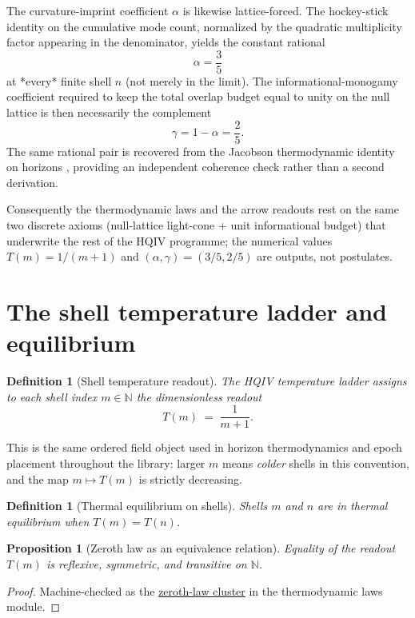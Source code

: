 \documentclass[11pt]{amsart}
\newtheorem{proposition}[theorem]{Proposition}
\newtheorem{definition}[theorem]{Definition}
\begin{document}
The curvature-imprint coefficient $\alpha$ is likewise lattice-forced. The
hockey-stick identity on the cumulative mode count, normalized by the quadratic
multiplicity factor appearing in the denominator, yields the constant rational
\[
  \alpha = \frac{3}{5}
\]
at *every* finite shell $n$ (not merely in the limit). The informational-monogamy
coefficient required to keep the total overlap budget equal to unity on the null
lattice is then necessarily the complement
\[
  \gamma = 1-\alpha = \frac{2}{5}.
\]
The same rational pair is recovered from the Jacobson thermodynamic identity on
horizons \cite{Jacobson1995,brodie2026}, providing an independent coherence check
rather than a second derivation.

Consequently the thermodynamic laws and the arrow readouts rest on the same two
discrete axioms (null-lattice light-cone + unit informational budget) that
underwrite the rest of the HQIV programme; the numerical values $T(m)=1/(m+1)$ and
$(\alpha,\gamma)=(3/5,2/5)$ are outputs, not postulates.

\section{The shell temperature ladder and equilibrium}
\label{sec:ladder}

\begin{definition}[Shell temperature readout]
\label{def:T-ladder}
The HQIV temperature ladder assigns to each shell index $m\in\mathbb{N}$ the
dimensionless readout
\[
  T(m) \;=\; \frac{1}{m+1}.
\]
\end{definition}

This is the same ordered field object used in horizon thermodynamics and epoch placement
throughout the library: larger $m$ means \emph{colder} shells in this convention, and the
map $m\mapsto T(m)$ is strictly decreasing.

\begin{definition}[Thermal equilibrium on shells]
\label{def:thermal-eq}
Shells $m$ and $n$ are in thermal equilibrium when $T(m)=T(n)$.
\end{definition}

\begin{proposition}[Zeroth law as an equivalence relation]
\label{prop:zeroth}
Equality of the readout $T(m)$ is reflexive, symmetric, and transitive on
$\mathbb{N}$.
\end{proposition}

\begin{proof}
Machine-checked as the \hyperref[lean:zeroth-law]{zeroth-law cluster} in the thermodynamic
laws module.
\end{proof}
\end{document}
